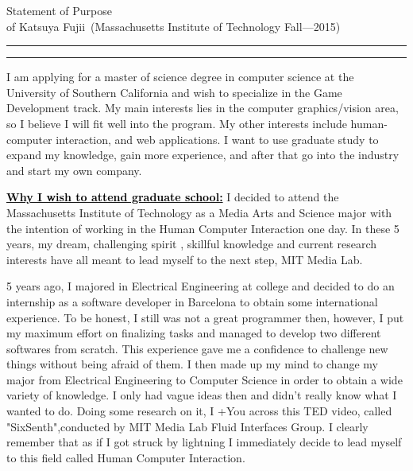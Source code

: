 \documentclass{article}
\newcommand{\soptitle}{Statement of Purpose}
\newcommand{\yourname}{Katsuya Fujii}
\newcommand{\statement}[1]{\par\medskip
  \underline{\textcolor{black}{\textbf{#1:}}}\space
}
\begin{document}
\begin{center}\LARGE\soptitle\\
\large of \yourname\ (Massachusetts Institute of Technology Fall---2015)
\end{center}

\hrule
\vspace{1pt}
\hrule height 1pt

\bigskip


I am applying for a master of science degree in computer science at the University of Southern California and wish to specialize in the Game Development track. My main interests lies in the computer graphics/vision area, so I believe I will fit well into the program. My other interests include human-computer interaction, and web applications. I want to use graduate study to expand my knowledge, gain more experience, and after that go into the industry and start my own company.

\statement{Why I wish to attend graduate school} I decided to attend the Massachusetts Institute of Technology as a Media Arts and Science major with the intention of working in the Human Computer Interaction one day. In these 5 years, my dream, challenging spirit , skillful knowledge and current research interests have all meant to lead myself to the next step, MIT Media Lab.

5 years ago, I majored in Electrical Engineering at college and decided to do an internship as a software developer in Barcelona to obtain some international experience.  To be honest, I still was not a great programmer then, however, I put my maximum effort on finalizing tasks and managed to develop two different softwares from scratch. This experience gave me a confidence to challenge new things without being afraid of them. I then made up my mind to change my major from Electrical Engineering to Computer Science in order to obtain a wide variety of knowledge. I only had vague ideas then and didn't really know what I wanted to do. Doing some research on it, I +You across this TED video, called "SixSenth",conducted by MIT Media Lab Fluid Interfaces Group. I clearly remember that as if I got struck by lightning I immediately decide to lead myself to this field called Human Computer Interaction. 
\end{document}
